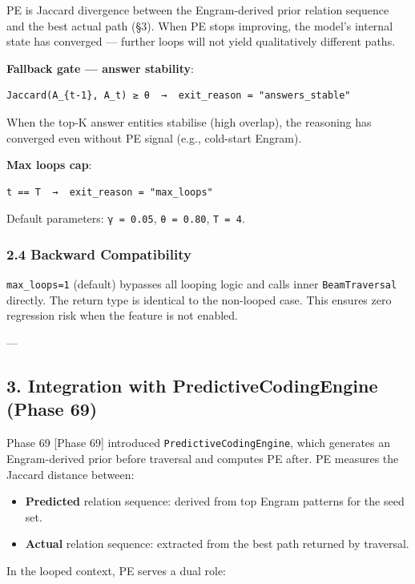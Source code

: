 PE is Jaccard divergence between the Engram-derived prior relation sequence and the best actual path (§3). When PE stops improving, the model's internal state has converged — further loops will not yield quali\-tatively different paths.

\textbf{Fallback gate — answer stability}:
\begin{lstlisting}
Jaccard(A_{t-1}, A_t) ≥ θ  →  exit_reason = "answers_stable"
\end{lstlisting}

When the top-K answer entities stabilise (high overlap), the reasoning has converged even without PE signal (e.g., cold-start Engram).

\textbf{Max loops cap}:
\begin{lstlisting}
t == T  →  exit_reason = "max_loops"
\end{lstlisting}

Default parameters: \texttt{γ = 0.05}, \texttt{θ = 0.80}, \texttt{T = 4}.

\subsubsection{2.4 Backward Compat\-ibility}

\texttt{max\_loops=1} (default) bypasses all looping logic and calls inner \texttt{BeamTraversal} directly. The return type is identical to the non-looped case. This ensures zero regression risk when the feature is not enabled.

---

\subsection{3. Integration with PredictiveCodingEngine (Phase 69)}

Phase 69 [Phase 69] introduced \texttt{PredictiveCodingEngine}, which generates an Engram-derived prior before traversal and computes PE after. PE measures the Jaccard distance between:
\begin{itemize}
\item \textbf{Predicted} relation sequence: derived from top Engram patterns for the seed set.
\item \textbf{Actual} relation sequence: extracted from the best path returned by traversal.

\end{itemize}
In the looped context, PE serves a dual role:

